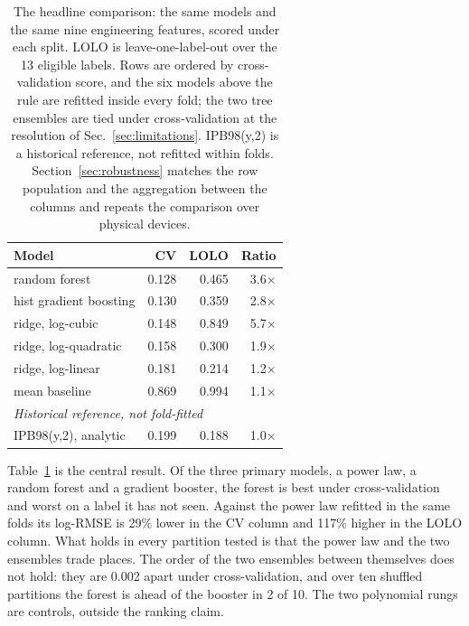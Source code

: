\documentclass[aip,pop,preprint,amsmath,amssymb]{revtex4-2}
\begin{document}
\begin{table}[t]
\caption{The headline comparison: the same models and the same nine
engineering features, scored under each split. LOLO is leave-one-label-out
over the 13 eligible labels. Rows are ordered by cross-validation score, and
the six models above the rule are refitted inside every fold; the two tree
ensembles are tied under cross-validation at the resolution of
Sec.~\ref{sec:limitations}. IPB98(y,2) is a historical reference, not refitted
within folds. Section~\ref{sec:robustness}
matches the row population and the aggregation between the columns and
repeats the comparison over physical devices.}
\label{tab:reversal}
\begin{ruledtabular}
\begin{tabular}{lrrr}
Model & CV & LOLO & Ratio \\
\hline
random forest            & 0.128 & 0.465 & 3.6$\times$ \\
hist gradient boosting   & 0.130 & 0.359 & 2.8$\times$ \\
ridge, log-cubic         & 0.148 & 0.849 & 5.7$\times$ \\
ridge, log-quadratic     & 0.158 & 0.300 & 1.9$\times$ \\
ridge, log-linear        & 0.181 & 0.214 & 1.2$\times$ \\
mean baseline            & 0.869 & 0.994 & 1.1$\times$ \\
\hline
\multicolumn{4}{l}{\emph{Historical reference, not fold-fitted}} \\
IPB98(y,2), analytic     & 0.199 & 0.188 & 1.0$\times$ \\
\end{tabular}
\end{ruledtabular}
\end{table}

Table~\ref{tab:reversal} is the central result. Of the three primary models, a
power law, a random forest and a gradient booster, the forest is best under
cross-validation and worst on a label it has not seen. Against the power law
refitted in the same folds its log-RMSE is 29\% lower in the CV column and
117\% higher in the LOLO column. What holds in every partition tested is that the power law
and the two ensembles trade places. The order of the two ensembles between
themselves does not hold: they are 0.002 apart under cross-validation, and over
ten shuffled partitions the forest is ahead of the booster in 2 of 10. The two
polynomial rungs are controls, outside the ranking claim.
\end{document}
